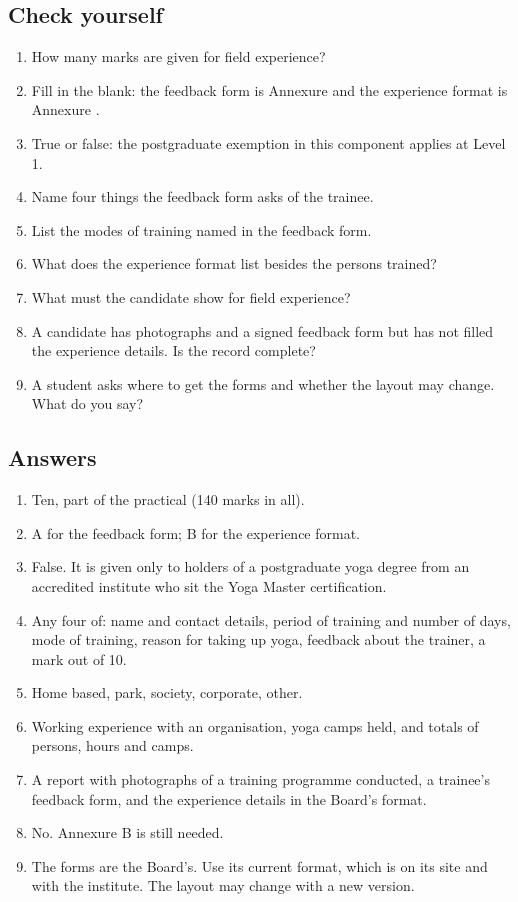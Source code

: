 \subsection*{Check yourself}

\begin{enumerate}
\item How many marks are given for field experience?
\item Fill in the blank: the feedback form is Annexure \underline{\hspace{1cm}} and the experience format is Annexure \underline{\hspace{1cm}}.
\item True or false: the postgraduate exemption in this component applies at Level 1.
\item Name four things the feedback form asks of the trainee.
\item List the modes of training named in the feedback form.
\item What does the experience format list besides the persons trained?
\item What must the candidate show for field experience?
\item A candidate has photographs and a signed feedback form but has not filled the experience details. Is the record complete?
\item A student asks where to get the forms and whether the layout may change. What do you say?
\end{enumerate}

\subsection*{Answers}

\begin{enumerate}
\item Ten, part of the practical (140 marks in all).
\item A for the feedback form; B for the experience format.
\item False. It is given only to holders of a postgraduate yoga degree from an accredited institute who sit the Yoga Master certification.
\item Any four of: name and contact details, period of training and number of days, mode of training, reason for taking up yoga, feedback about the trainer, a mark out of 10.
\item Home based, park, society, corporate, other.
\item Working experience with an organisation, yoga camps held, and totals of persons, hours and camps.
\item A report with photographs of a training programme conducted, a trainee's feedback form, and the experience details in the Board's format.
\item No. Annexure B is still needed.
\item The forms are the Board's. Use its current format, which is on its site and with the institute. The layout may change with a new version.
\end{enumerate}


